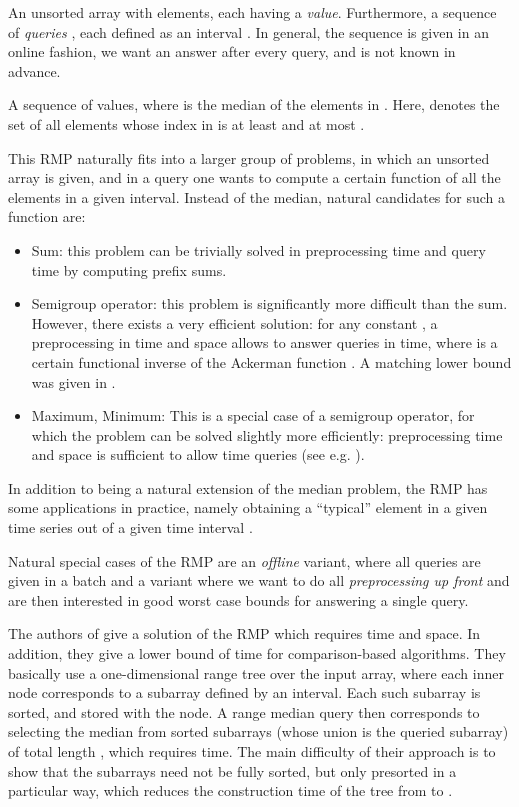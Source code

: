 \documentclass[a4paper,10pt]{article}
\begin{document}
 An unsorted array  with  elements, each
having a \emph{value}. Furthermore, a sequence of  \emph{queries}
, each defined as an interval .
In general, the sequence is given in an online
fashion, 
we want an answer after every query, and  is not known in advance.

 A sequence  of values, where
 is the median of the elements in .  Here, 
denotes the set of all elements whose index in  is at least
 and at most .


This RMP naturally fits into a larger group of problems, in which an
unsorted array is given, and in a query one wants to compute a certain function of all the elements in a
given interval. 
Instead of the median, natural candidates for such a function are:
\begin{itemize}
 \item Sum: this problem can be trivially solved in  preprocessing time and  query time by computing prefix sums.
\item Semigroup operator: this problem is significantly more difficult than the sum. However, there exists a very efficient solution: for any constant , a preprocessing in  time and space allows to answer queries in  time,
where  is a certain functional inverse of the Ackerman function \cite{802185}. A matching lower bound was given in \cite{DBLP:journals/siamcomp/Yao85a}.
\item Maximum, Minimum: This is a special case of a semigroup operator, for which the problem can be solved slightly more efficiently:  preprocessing time and space is sufficient to allow  time queries (see e.g. \cite{DBLP:journals/tcs/BenderF04}).
\end{itemize}
In addition to being a natural extension of the median problem, the RMP has some applications in practice, namely obtaining a ``typical'' element in a given time series out of a given time interval \cite{DBLP:conf/esa/Har-PeledM08}.

Natural special cases of the RMP are an \emph{offline} variant, where all queries are given 
in a batch and a variant where we want to do all \emph{preprocessing up front} and are then interested in
good worst case bounds for answering a single query.


The authors of \cite{DBLP:conf/esa/Har-PeledM08} give a solution of
the RMP which requires  time and
 space. In addition, they give a lower bound of
 time for comparison-based algorithms.
They basically use a one-dimensional range tree over the input array, where each inner node corresponds to a
subarray defined by an interval. Each such subarray is  sorted, and stored with the node. 
A range median query then corresponds to selecting the median from   sorted subarrays (whose union is the queried subarray) of total length , which requires  time. 
The main difficulty of their approach is to show that  the subarrays need  not be fully sorted, but only presorted in a particular way, which 
reduces the construction time of the tree from  to .
\end{document}
